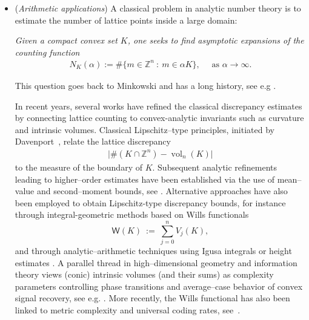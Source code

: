 \documentclass[11pt]{article}
\theoremstyle{definition}
\numberwithin{equation}{section}
\DeclareMathOperator{\vol}{vol}
\begin{document}
\begin{itemize}
    \item[$\bullet$]
    (\textit{Arithmetic applications})
    A classical problem in analytic number theory is to estimate the number of lattice points inside a large domain:
    \begin{center}
        \textit{Given a compact convex set $K$, one seeks to find asymptotic expansions of the counting function
        \begin{align*}
            N_K(\alpha) := \# \big\{ m \in \mathbb Z^n ~:~ m \in \alpha K    \big\}, \quad \text{ as } \alpha \to \infty.
        \end{align*}
        }
    \end{center}
    This question goes back to Minkowski and has a long history, see e.g \cite{Cassels1959, GruberLekkerkerker1987, Huxley1996, IvicKratzelKuehleitnerNowak2006, Kratzel1989}.

    \medskip

    In recent years, several works have refined the classical discrepancy estimates by connecting lattice counting to convex-analytic invariants such as curvature and intrinsic volumes.
    Classical Lipschitz--type principles, initiated by Davenport~\cite{Davenport1951, Davenport1964Corr}, relate the lattice discrepancy 
    \begin{align*}
        \big\vert \#(K \cap \mathbb Z^n) - \vol_n(K) \big\vert
    \end{align*}
    to the measure of the boundary of $K$.
    Subsequent analytic refinements leading to higher--order estimates have been established via the use of mean--value and second--moment bounds, see \cite{Rogers1955, Rogers1956, Huxley1996}.
    Alternative approaches have also been employed to obtain Lipschitz-type discrepancy bounds, for instance through integral-geometric methods based on Wills functionals \cite{W_1973,H_1975}
    \[
    \mathsf W(K)\ :=\ \sum_{j=0}^{n} V_j(K),
    \]
    and through analytic--arithmetic techniques using Igusa integrals or height estimates \cite{ChambertLoirTschinkel2010, Widmer2010Primitive, Widmer2012Lipschitz}. 
    A parallel thread in high–dimensional geometry and information theory views (conic) intrinsic volumes (and their sums) as complexity parameters controlling phase transitions and average–case behavior of convex signal recovery, see e.g. \cite{ALMT14}. 
    More recently, the Wills functional has also been linked to metric complexity and universal coding rates, see~\cite{Mourtada25}. 

    \medskip


\end{itemize}
\end{document}
